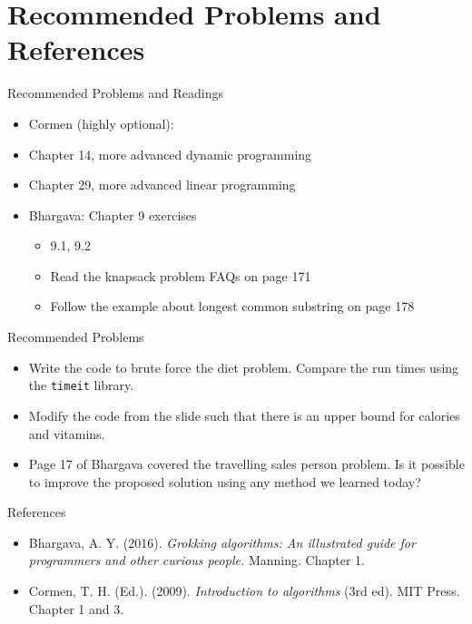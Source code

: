 \documentclass[
  ignorenonframetext,
]{beamer}
\begin{document}
\hypertarget{recommended-problems-and-references}{%
\section{Recommended Problems and
References}\label{recommended-problems-and-references}}

\begin{frame}{Recommended Problems and Readings}
\protect\hypertarget{recommended-problems-and-readings}{}
\begin{itemize}
\item
  Cormen (highly optional):
\item
  Chapter 14, more advanced dynamic programming
\item
  Chapter 29, more advanced linear programming
\item
  Bhargava: Chapter 9 exercises

  \begin{itemize}
  \item
    9.1, 9.2
  \item
    Read the knapsack problem FAQs on page 171
  \item
    Follow the example about longest common substring on page 178
  \end{itemize}
\end{itemize}
\end{frame}

\begin{frame}[fragile]{Recommended Problems}
\protect\hypertarget{recommended-problems}{}
\begin{itemize}
\item
  Write the code to brute force the diet problem. Compare the run times
  using the \texttt{timeit} library.
\item
  Modify the code from the slide such that there is an upper bound for
  calories and vitamins.
\item
  Page 17 of Bhargava covered the travelling sales person problem. Is it
  possible to improve the proposed solution using any method we learned
  today?
\end{itemize}
\end{frame}

\begin{frame}{References}
\protect\hypertarget{references}{}
\begin{itemize}
\item
  Bhargava, A. Y. (2016). \emph{Grokking algorithms: An illustrated
  guide for programmers and other curious people.} Manning. Chapter 1.
\item
  Cormen, T. H. (Ed.). (2009). \emph{Introduction to algorithms} (3rd
  ed). MIT Press. Chapter 1 and 3.
\end{itemize}
\end{frame}
\end{document}
